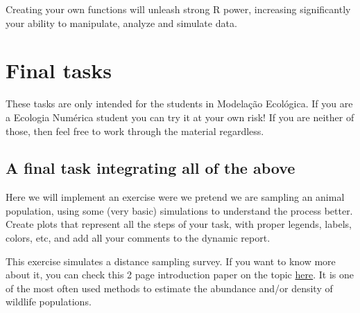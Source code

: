 \documentclass[
]{article}
\begin{document}
Creating your own functions will unleash strong R power, increasing
significantly your ability to manipulate, analyze and simulate data.

\section{Final tasks}\label{final-tasks}

These tasks are only intended for the students in Modelação Ecológica.
If you are a Ecologia Numérica student you can try it at your own risk!
If you are neither of those, then feel free to work through the material
regardless.

\subsection{A final task integrating all of the
above}\label{a-final-task-integrating-all-of-the-above}

Here we will implement an exercise were we pretend we are sampling an
animal population, using some (very basic) simulations to understand the
process better. Create plots that represent all the steps of your task,
with proper legends, labels, colors, etc, and add all your comments to
the dynamic report.

This exercise simulates a distance sampling survey. If you want to know
more about it, you can check this 2 page introduction paper on the topic
\href{https://github.com/TiagoAMarques/AnIntro2RTutorial/blob/40f353b63cb465c36dfa8f358e0e0d1cba45967a/Marques2009b.pdf}{here}.
It is one of the most often used methods to estimate the abundance
and/or density of wildlife populations.
\end{document}
